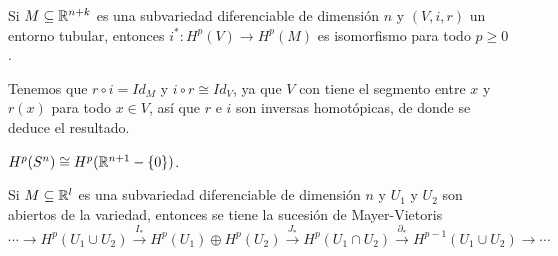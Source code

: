 \documentclass[CV.tex]{subfiles}
\begin{document}
\begin{coro}
Si $M\subseteq\mathbb{R}^{n+k}$ es una subvariedad diferenciable de dimensión $n$ y $(V,i,r)$ un entorno tubular, entonces $i^*:H^p(V)\to H^p(M)$ es isomorfismo para todo $p\geq 0$.
\end{coro}
\begin{dem}
Tenemos que $r\circ i=Id_M$ y $i\circ r\cong Id_V$, ya que $V$ con tiene el segmento entre $x$ y $r(x)$ para todo $x\in V$, así que $r$ e $i$ son inversas homotópicas, de donde se deduce el resultado. \QED
\end{dem}

\begin{ej}
$H^p(S^n)\cong H^p(\mathbb{R}^{n+1}-\{0\})$. 
\end{ej}

\begin{nota}
Si $M\subseteq\mathbb{R}^l$ es una subvariedad diferenciable de dimensión $n$ y $U_1$ y $U_2$ son abiertos de la variedad, entonces se tiene la sucesión de Mayer-Vietoris
\[
\cdots\to H^p(U_1\cup U_2)\xrightarrow{I_*}H^p(U_1)\oplus H^p(U_2)\xrightarrow{J_*}H^p(U_1\cap U_2)\xrightarrow{\partial_*}H^{p-1}(U_1\cup U_2)\to\cdots 
\]
\end{nota}
\end{document}
